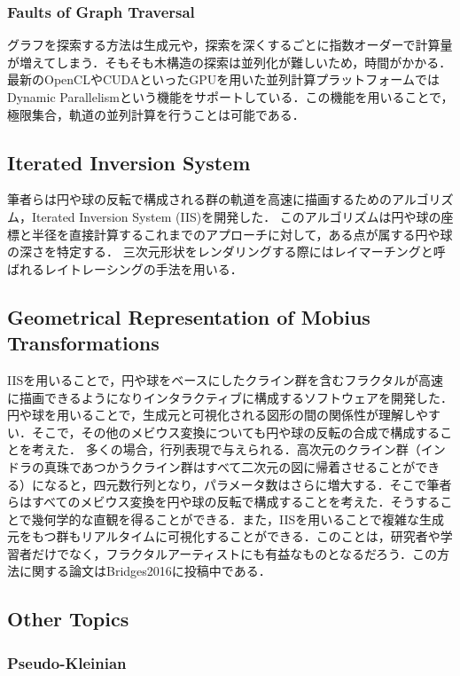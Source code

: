 \subsubsection{Faults of Graph Traversal}
グラフを探索する方法は生成元や，探索を深くするごとに指数オーダーで計算量が増えてしまう．そもそも木構造の探索は並列化が難しいため，時間がかかる．
最新のOpenCLやCUDAといったGPUを用いた並列計算プラットフォームではDynamic Parallelismという機能をサポートしている．この機能を用いることで，極限集合，軌道の並列計算を行うことは可能である．

\subsection{Iterated Inversion System}
筆者らは円や球の反転で構成される群の軌道を高速に描画するためのアルゴリズム，Iterated Inversion System (IIS)\cite{iis}を開発した．
このアルゴリズムは円や球の座標と半径を直接計算するこれまでのアプローチに対して，ある点が属する円や球の深さを特定する．
三次元形状をレンダリングする際にはレイマーチングと呼ばれるレイトレーシングの手法を用いる．

\subsection{Geometrical Representation of Mobius Transformations}
IISを用いることで，円や球をベースにしたクライン群を含むフラクタルが高速に描画できるようになりインタラクティブに構成するソフトウェアを開発した．
円や球を用いることで，生成元と可視化される図形の間の関係性が理解しやすい．そこで，その他のメビウス変換についても円や球の反転の合成で構成することを考えた．
多くの場合，行列表現で与えられる．高次元のクライン群（インドラの真珠であつかうクライン群はすべて二次元の図に帰着させることができる）になると，四元数行列となり，パラメータ数はさらに増大する．そこで筆者らはすべてのメビウス変換を円や球の反転で構成することを考えた．そうすることで幾何学的な直観を得ることができる．また，IISを用いることで複雑な生成元をもつ群もリアルタイムに可視化することができる．このことは，研究者や学習者だけでなく，フラクタルアーティストにも有益なものとなるだろう．この方法に関する論文はBridges2016に投稿中である．

\subsection{Other Topics}
\subsubsection{Pseudo-Kleinian}

